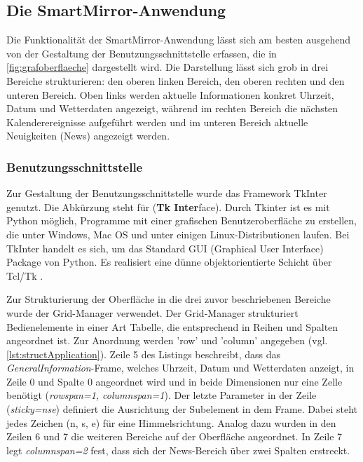 \subsection{Die SmartMirror-Anwendung}
\label{smartMirror}
Die Funktionalität der SmartMirror-Anwendung lässt sich am besten ausgehend von der Gestaltung der Benutzungsschnittstelle erfassen, die in \autoref{fig:grafoberflaeche} dargestellt wird. Die Darstellung lässt sich grob in drei Bereiche strukturieren: den oberen linken Bereich, den oberen rechten und den unteren Bereich. Oben links werden aktuelle Informationen konkret Uhrzeit, Datum und Wetterdaten angezeigt, während im rechten Bereich die nächsten Kalenderereignisse aufgeführt werden und im unteren Bereich aktuelle Neuigkeiten (News) angezeigt werden. 

\subsubsection*{Benutzungsschnittstelle}

Zur Gestaltung der Benutzungsschnittstelle wurde das Framework TkInter genutzt. Die Abkürzung steht für (\textbf{Tk Inter}face).  Durch Tkinter ist es mit Python möglich, Programme mit einer grafischen Benutzeroberfläche zu erstellen, die unter Windows, Mac OS und unter einigen Linux-Distributionen laufen. Bei TkInter handelt es sich, um das Standard GUI (Graphical User Interface) Package von Python. Es realisiert eine dünne objektorientierte Schicht über Tcl/Tk \cite{scholl2014tcl}. 

Zur Strukturierung der Oberfläche in die drei zuvor beschriebenen Bereiche wurde der Grid-Manager verwendet. Der Grid-Manager strukturiert Bedienelemente in einer Art Tabelle, die entsprechend in Reihen und Spalten angeordnet ist. Zur Anordnung werden 'row' und 'column' angegeben (vgl. \autoref{lst:structApplication}). Zeile 5 des Listings beschreibt, dass das \textit{GeneralInformation}-Frame, welches Uhrzeit, Datum und Wetterdaten anzeigt, in Zeile 0 und Spalte 0 angeordnet wird und in beide Dimensionen nur eine Zelle benötigt (\textit{rowspan=1, columnspan=1}). Der letzte Parameter in der Zeile (\textit{sticky=\grqq nse\grqq}) definiert die Ausrichtung der Subelement in dem Frame. Dabei steht jedes Zeichen (n, s, e) für eine Himmelsrichtung. Analog dazu wurden in den Zeilen 6 und 7 die weiteren Bereiche auf der Oberfläche angeordnet. In Zeile 7 legt \textit{\textit{columnspan=2}} fest, dass sich der News-Bereich über zwei Spalten erstreckt.

\begin{minipage}{\textwidth}
	
\end{minipage}

